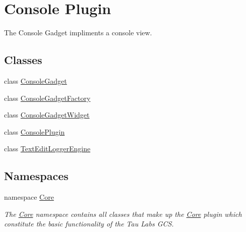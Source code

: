 \hypertarget{group___console_plugin}{\section{\-Console \-Plugin}
\label{group___console_plugin}
}


\-The \-Console \-Gadget impliments a console view.  


\subsection*{\-Classes}
\begin{DoxyCompactItemize}
\item 
class \hyperlink{class_console_gadget}{\-Console\-Gadget}
\item 
class \hyperlink{class_console_gadget_factory}{\-Console\-Gadget\-Factory}
\item 
class \hyperlink{class_console_gadget_widget}{\-Console\-Gadget\-Widget}
\item 
class \hyperlink{class_console_plugin}{\-Console\-Plugin}
\item 
class \hyperlink{class_text_edit_logger_engine}{\-Text\-Edit\-Logger\-Engine}
\end{DoxyCompactItemize}
\subsection*{\-Namespaces}
\begin{DoxyCompactItemize}
\item 
namespace \hyperlink{namespace_core}{\-Core}
\begin{DoxyCompactList}\small\item\em \-The \hyperlink{namespace_core}{\-Core} namespace contains all classes that make up the \hyperlink{namespace_core}{\-Core} plugin which constitute the basic functionality of the \-Tau \-Labs \-G\-C\-S. \end{DoxyCompactList}\end{DoxyCompactItemize}
